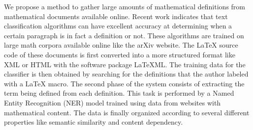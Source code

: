 We propose a method to gather large amounts of  mathematical definitions from  mathematical documents available online.
Recent work indicates that text classification algorithms can have excellent accuracy  at determining when a certain paragraph is in fact a definition or not. These algorithms are trained on large math corpora available online like the arXiv website. The \LaTeX{}    source code of these documents is first converted into a more structured format like XML or HTML with the software package LaTeXML. The training data for the classifier is then obtained by searching for the definitions that the author labeled with a \LaTeX{} macro. The second phase of the system consists of extracting the term being defined from each definition. This task is performed by a Named Entity Recognition (NER) model trained using data from websites with mathematical content. The data is finally organized according to several different properties like semantic similarity and content dependency. 
